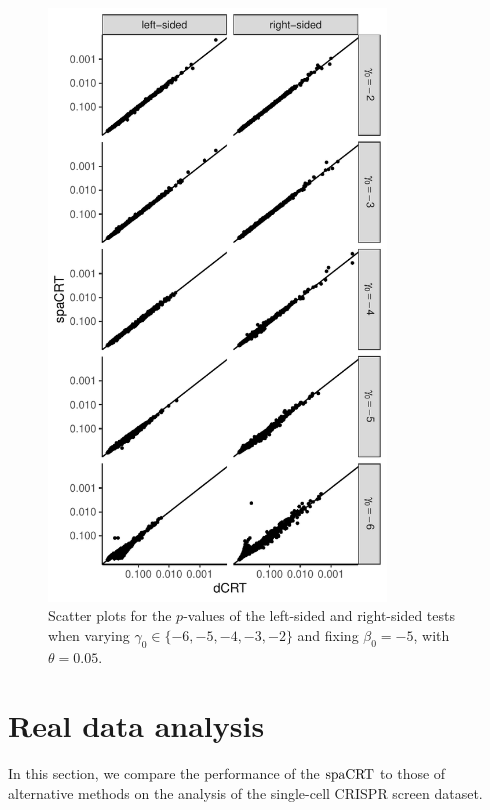 \documentclass[12pt]{article}
\theoremstyle{definition}
\newcommand{\spacrt}{\textnormal{spaCRT}}               %
\begin{document}
\begin{figure}
  \centering
  \includegraphics[width=0.8\textwidth]{figures-and-tables/simulation/QQ/plot-bin-NB-normal-B-50000-n-5000-5e3-n5-n5-disp-5e-2full-dCRT-spaCRT-varying-gamma.pdf}
  \caption{Scatter plots for the $p$-values of the left-sided and right-sided tests when varying $\gamma_0\in \{-6,-5,-4,-3,-2\}$ and fixing $\beta_0=-5$, with $\theta = 0.05$.}
  \label{fig:simulation-dot-plot-varying-gamma-theta-0.05}
\end{figure}



\section{Real data analysis} \label{sec:real_data}

In this section, we compare the performance of the $\spacrt$ to those of alternative methods on the analysis of the \citet{Gasperini2019a} single-cell CRISPR screen dataset. 
\end{document}
